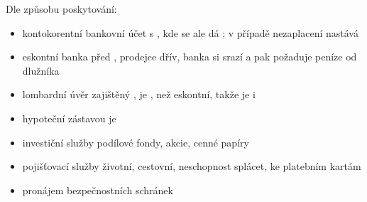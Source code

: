\documentclass[ekobook.tex]{subfiles}
\begin{document}
{\begin{wnumbered}
Dle způsobu poskytování:
\begin{itemize}[label=\textcolor{WPP}{$\hookrightarrow$}]
\item kontokorentní \texthl{$\rightarrow$} bankovní účet s , kde se ale dá ; v případě nezaplacení nastává 
\item eskontní \texthl{$\rightarrow$} banka  před , prodejce  dřív, banka si srazí  a pak požaduje peníze od dlužníka
\item lombardní \texthl{$\rightarrow$} úvěr zajištěný , je , než eskontní, takže je i 
\item hypoteční \texthl{$\rightarrow$} zástavou je 
\end{itemize}
\item {}
\begin{itemize}[label=\textcolor{WPP}{$\hookrightarrow$}]
\item investiční služby \texthl{$\rightarrow$} podílové fondy, akcie, cenné papíry
\item pojišťovací služby \texthl{$\rightarrow$} životní, cestovní, neschopnost splácet, ke platebním kartám
\item pronájem bezpečnostních schránek
\end{itemize}
\end{wnumbered}
}
\wbreak
\end{document}
